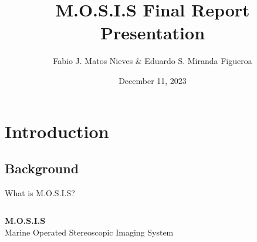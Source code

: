 \documentclass[17pt, aspectratio=169]{beamer}
\title{M.O.S.I.S Final Report Presentation}
\author[Fabio J. \& Eduardo S.]{Fabio J. Matos Nieves \& Eduardo S. Miranda Figueroa}
\institute[UPRM]{University of Puerto Rico Mayagüez Campus}
\date{December 11, 2023}
\begin{document}
\begin{frame}
	\maketitle
\end{frame}
\begin{frame}
	\tableofcontents
\end{frame}
\section{Introduction}
\subsection*{Background}
\begin{frame}{What is M.O.S.I.S?}
	\begin{columns}
		\centering
		\textbf{M.O.S.I.S}\\
		Marine Operated Stereoscopic Imaging System


\end{columns}
\end{frame}
\end{document}
